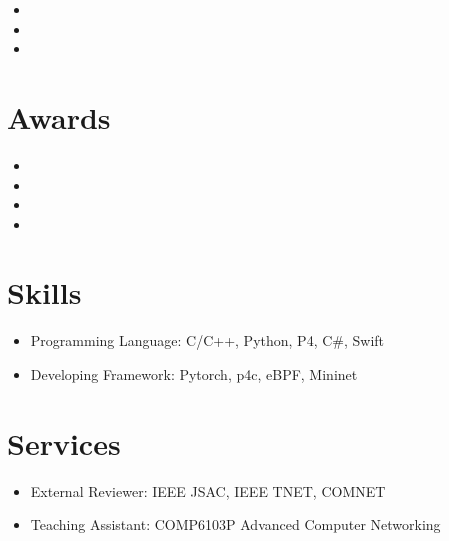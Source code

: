 \documentclass{resume}
\begin{document}
\begin{itemize}[parsep=0.5ex]
  \item {}
  \item {}
  \item {}
\end{itemize}

\section{Awards}

\begin{itemize}[parsep=0.5ex]
  \item {}
  \item {}
  \item {}
  \item {}
\end{itemize}

\section{Skills}

\begin{itemize}[parsep=0.5ex]
  \item Programming Language: C/C++, Python, P4, C\#, Swift
  \item Developing Framework: Pytorch, p4c, eBPF, Mininet
\end{itemize}

\section{Services}

\begin{itemize}[parsep=0.5ex]
  \item External Reviewer: IEEE JSAC, IEEE TNET, COMNET
  \item Teaching Assistant: COMP6103P Advanced Computer Networking
\end{itemize}
\end{document}

